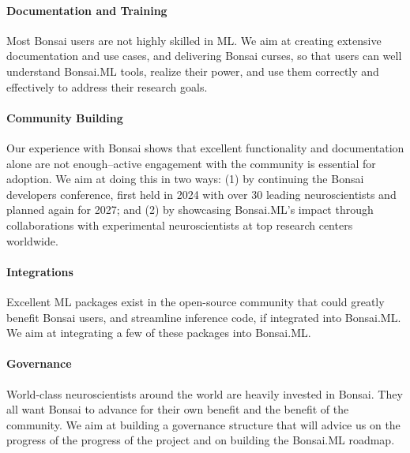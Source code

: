 
\paragraph{Documentation and Training} Most Bonsai users are not highly skilled
in ML. We aim at creating extensive documentation and use cases, and delivering
Bonsai curses, so that users can well understand Bonsai.ML tools, realize their
power, and use them correctly and effectively to address their research goals.

\paragraph{Community Building} Our experience with Bonsai shows that excellent
functionality and documentation alone are not enough--active engagement with the
community is essential for adoption. We aim at doing this in two ways: (1) by
continuing the Bonsai developers conference, first held in 2024 with over 30
leading neuroscientists and planned again for 2027; and (2) by showcasing
Bonsai.ML’s impact through collaborations with experimental neuroscientists at
top research centers worldwide.

\paragraph{Integrations} Excellent ML packages exist in the open-source
community that could greatly benefit Bonsai users, and streamline
inference code, if integrated into Bonsai.ML. We aim at integrating a few of
these packages into Bonsai.ML.

\paragraph{Governance} World-class neuroscientists around the world are heavily
invested in Bonsai. They all want Bonsai to advance for their own benefit and
the benefit of the community. We aim at building a governance structure that
will advice us on the progress of the progress of the project and on building
the Bonsai.ML roadmap.
